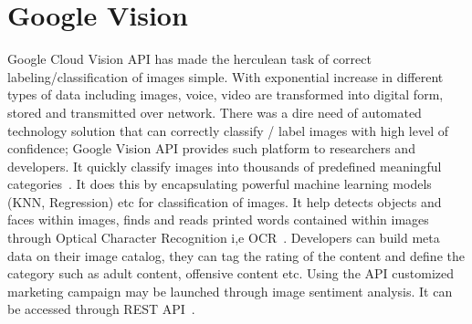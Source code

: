 \section{Google Vision}

Google Cloud Vision API has made the herculean task of correct 
labeling/classification of images simple. With exponential increase 
in different types of data including images, voice, video are 
transformed into digital form, stored and transmitted over network. 
There was a dire need of automated technology solution that can 
correctly classify / label images with high level of confidence; 
Google Vision API provides such platform to researchers and developers. 
It quickly classify images into thousands of predefined 
meaningful categories~\cite{hid-sp18-523-www-google-vision}. 
It does this by encapsulating powerful machine learning 
models (KNN, Regression) etc for classification of images. 
It help detects objects and faces within images, finds and reads 
printed words contained within images through 
Optical Character Recognition i,e OCR~\cite{hid-sp18-523-www-google-vision}. 
Developers can build meta data on their image catalog, they can tag the
rating of the content and define the category such as adult content, 
offensive content etc. Using the API customized marketing campaign may be
launched through image sentiment analysis. It can be accessed 
through REST API~\cite{hid-sp18-523-www-google-vision}.

